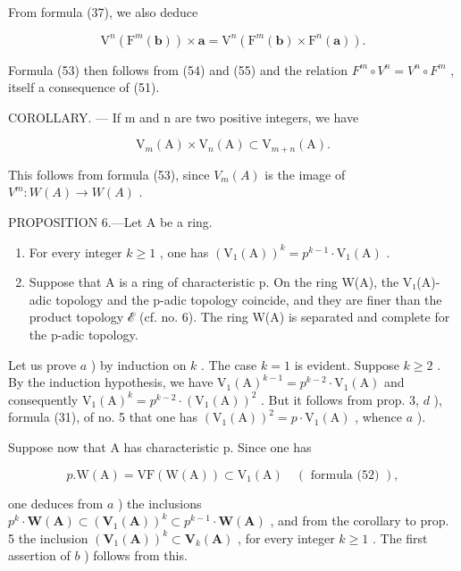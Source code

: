 From formula (37), we also deduce

\[
\mathrm{V} ^ {n} \left(\mathrm{F} ^ {m} (\boldsymbol {b})\right) \times \boldsymbol {a} = \mathrm{V} ^ {n} \left(\mathrm{F} ^ {m} (\boldsymbol {b}) \times \mathrm{F} ^ {n} (\boldsymbol {a})\right).\tag{55}
\]

Formula (53) then follows from (54) and (55) and the relation \(F^{m} \circ V^{n} = V^{n} \circ F^{m}\) , itself a consequence of (51).

COROLLARY. --- If m and n are two positive integers, we have

\[
\mathrm{V} _ {m} (\mathrm{A}) \times \mathrm{V} _ {n} (\mathrm{A}) \subset \mathrm{V} _ {m + n} (\mathrm{A}).
\]

This follows from formula (53), since \(V_{m}(A)\) is the image of \(V^{m}:W(A)\to W(A)\) .

PROPOSITION 6.---Let A be a ring.

\begin{enumerate}
\def\labelenumi{\alph{enumi})}
\item
  For every integer \(k \geqslant 1\) , one has \((\mathrm{V}_1(\mathrm{A}))^k = p^{k-1} \cdot \mathrm{V}_1(\mathrm{A})\) .
\item
  Suppose that A is a ring of characteristic p. On the ring W(A), the V₁(A)-adic topology and the p-adic topology coincide, and they are finer than the product topology ℰ (cf. no. 6). The ring W(A) is separated and complete for the p-adic topology.
\end{enumerate}

Let us prove \(a\) ) by induction on \(k\) . The case \(k = 1\) is evident. Suppose \(k \geqslant 2\) . By the induction hypothesis, we have \(\mathrm{V}_{1}(\mathrm{A})^{k-1} = p^{k-2} \cdot \mathrm{V}_{1}(\mathrm{A})\) and consequently \(\mathrm{V}_{1}(\mathrm{A})^{k} = p^{k-2} \cdot (\mathrm{V}_{1}(\mathrm{A}))^{2}\) . But it follows from prop. 3, \(d\) ), formula (31), of no. 5 that one has \((\mathrm{V}_{1}(\mathrm{A}))^{2} = p \cdot \mathrm{V}_{1}(\mathrm{A})\) , whence \(a\) ).

Suppose now that A has characteristic p. Since one has

\[
p. \mathrm{W} (\mathrm{A}) = \mathrm{VF} (\mathrm{W} (\mathrm{A})) \subset \mathrm{V} _ {1} (\mathrm{A}) \quad (\text { formula (52) }),
\]

one deduces from \(a\) ) the inclusions \(p^{k} \cdot \mathbf{W}(\mathbf{A}) \subset (\mathbf{V}_{1}(\mathbf{A}))^{k} \subset p^{k-1} \cdot \mathbf{W}(\mathbf{A})\) , and from the corollary to prop. 5 the inclusion \((\mathbf{V}_{1}(\mathbf{A}))^{k} \subset \mathbf{V}_{k}(\mathbf{A})\) , for every integer \(k \geqslant 1\) . The first assertion of \(b\) ) follows from this.

